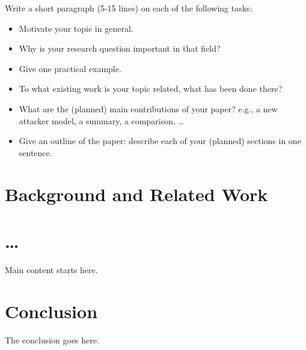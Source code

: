 \documentclass[sigconf]{acmart}
\begin{document}
Write a short paragraph (5-15 lines) on each of the following tasks:
\begin{itemize}
\item Motivate your topic in general.
\item Why is your research question important in that field?
\item Give one practical example.
\item To what existing work is your topic related, what has been done there?
\item What are the (planned) main contributions of your paper? e.g., a
new attacker model, a summary, a comparison, \dots
\item Give an outline of the paper: describe each of your (planned)
sections in one sentence.
\end{itemize}


\section{Background and Related Work}

\section{\dots}

Main content starts here. \nocite{*}


\section{Conclusion}
The conclusion goes here.



 
\end{document}
